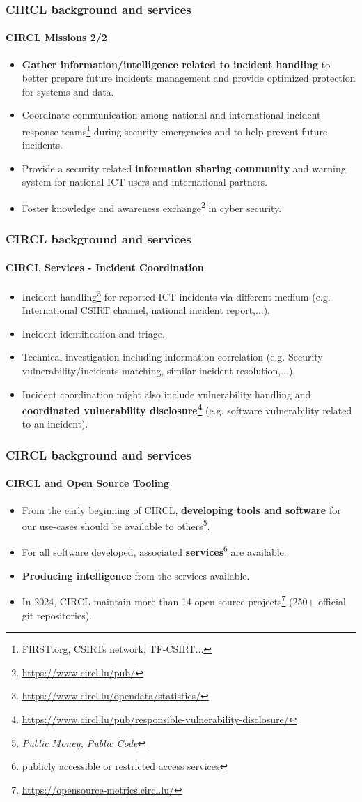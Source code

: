 \begin{frame}
\frametitle{CIRCL background and services}
\framesubtitle{CIRCL Missions 2/2}
\begin{itemize}
\item {\bf Gather information/intelligence related to incident handling} to better prepare future incidents management and provide optimized protection for systems and data.
\item Coordinate communication among national and international incident response teams\footnote{FIRST.org, CSIRTs network, TF-CSIRT...} during security emergencies and to help prevent future incidents.
\item Provide a security related {\bf information sharing community} and warning system for national ICT users and international partners.
\item Foster knowledge and awareness exchange\footnote{\url{https://www.circl.lu/pub/}} in cyber security.
\end{itemize}
\end{frame}


\begin{frame}
\frametitle{CIRCL background and services}
\framesubtitle{CIRCL Services - Incident Coordination}
    \begin{itemize}
        \item Incident handling\footnote{\url{https://www.circl.lu/opendata/statistics/}} for reported ICT incidents via different medium (e.g. International CSIRT channel, national incident report,...).
        \item Incident identification and triage.
        \item Technical investigation including information correlation (e.g. Security vulnerability/incidents matching, similar incident resolution,...).
        \item Incident coordination might also include vulnerability handling and {\bf coordinated vulnerability disclosure\footnote{\url{https://www.circl.lu/pub/responsible-vulnerability-disclosure/}}} (e.g. software vulnerability related to an incident).
    \end{itemize}
\end{frame}

\begin{frame}
\frametitle{CIRCL background and services}
\framesubtitle{CIRCL and Open Source Tooling}
    \begin{itemize}
        \item From the early beginning of CIRCL, {\bf developing tools and software} for our use-cases should be available to others\footnote{{\it Public Money, Public Code}}.
        \item For all software developed, associated {\bf services}\footnote{publicly accessible or restricted access services} are available.
        \item {\bf Producing intelligence} from the services available.
        \item In 2024, CIRCL maintain more than 14 open source projects\footnote{\url{https://opensource-metrics.circl.lu/}} (250+ official git repositories).
    \end{itemize}
\end{frame}

